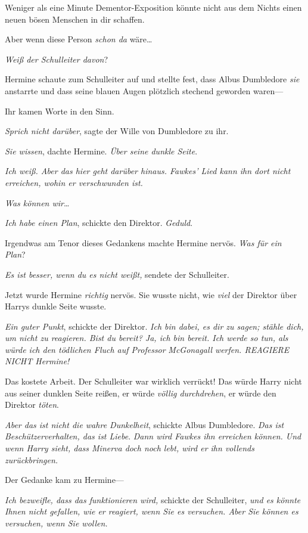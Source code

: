 {Weniger als eine Minute Dementor-Exposition könnte nicht aus dem Nichts einen neuen bösen Menschen in dir schaffen.

Aber wenn diese Person \emph{schon da} wäre…

\emph{Weiß der Schulleiter davon}?

Hermine schaute zum Schulleiter auf und stellte fest, dass Albus Dumbledore \emph{sie} anstarrte und dass seine blauen Augen plötzlich stechend geworden waren—

Ihr kamen Worte in den Sinn.

\emph{Sprich nicht darüber}, sagte der Wille von Dumbledore zu ihr.

\emph{Sie wissen}, dachte Hermine. \emph{Über seine dunkle Seite}.

\emph{Ich weiß. Aber das hier geht darüber hinaus. Fawkes' Lied kann ihn dort nicht erreichen, wohin er verschwunden ist.}

\emph{Was können wir}…

\emph{Ich habe einen Plan}, schickte den Direktor. \emph{Geduld}.

Irgendwas am Tenor dieses Gedankens machte Hermine nervös. \emph{Was für ein Plan}?

\emph{Es ist besser, wenn du es nicht weißt,} sendete der Schulleiter.

Jetzt wurde Hermine \emph{richtig} nervös. Sie wusste nicht, wie \emph{viel} der Direktor über Harrys dunkle Seite wusste.

\emph{Ein guter Punkt}, schickte der Direktor. \emph{Ich bin dabei, es dir zu sagen; stähle dich, um nicht zu reagieren. Bist du bereit? Ja, ich bin bereit. Ich werde so tun, als würde ich den tödlichen Fluch auf Professor} \emph{McGonagall} \emph{werfen. REAGIERE NICHT Hermine!}

Das kostete Arbeit. Der Schulleiter war wirklich verrückt! Das würde Harry nicht aus seiner dunklen Seite reißen, er würde \emph{völlig durchdrehen}, er würde den Direktor \emph{töten}.

\emph{Aber das ist nicht die wahre Dunkelheit}, schickte Albus Dumbledore. \emph{Das ist Beschützerverhalten, das ist Liebe}. \emph{Dann wird Fawkes ihn erreichen können. Und wenn Harry sieht, dass Minerva doch noch lebt, wird er ihn vollends zurückbringen.}

Der Gedanke kam zu Hermine—

\emph{Ich bezweifle, dass das funktionieren wird,} schickte der Schulleiter, \emph{und es könnte Ihnen nicht gefallen, wie er reagiert, wenn Sie es versuchen. Aber Sie können es versuchen, wenn Sie wollen.}

}
